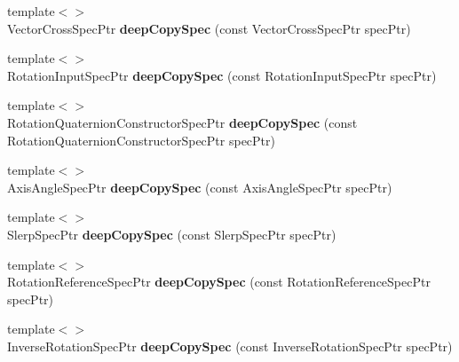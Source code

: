 \begin{DoxyCompactItemize}
\item 
\hypertarget{namespacegiskard__suturo_adc66694859df7fe09089b87107113737}{{\footnotesize template$<$$>$ }\\Vector\-Cross\-Spec\-Ptr {\bfseries deep\-Copy\-Spec} (const Vector\-Cross\-Spec\-Ptr spec\-Ptr)}\label{namespacegiskard__suturo_adc66694859df7fe09089b87107113737}

\item 
\hypertarget{namespacegiskard__suturo_ac5bf0b2ed34f80dd525c84e8700311f6}{{\footnotesize template$<$$>$ }\\Rotation\-Input\-Spec\-Ptr {\bfseries deep\-Copy\-Spec} (const Rotation\-Input\-Spec\-Ptr spec\-Ptr)}\label{namespacegiskard__suturo_ac5bf0b2ed34f80dd525c84e8700311f6}

\item 
\hypertarget{namespacegiskard__suturo_a8c1b9e0b11fcdef9b8a04fccae1e26cf}{{\footnotesize template$<$$>$ }\\Rotation\-Quaternion\-Constructor\-Spec\-Ptr {\bfseries deep\-Copy\-Spec} (const Rotation\-Quaternion\-Constructor\-Spec\-Ptr spec\-Ptr)}\label{namespacegiskard__suturo_a8c1b9e0b11fcdef9b8a04fccae1e26cf}

\item 
\hypertarget{namespacegiskard__suturo_ab0227fb767bd51652c4e56f6b62aa10a}{{\footnotesize template$<$$>$ }\\Axis\-Angle\-Spec\-Ptr {\bfseries deep\-Copy\-Spec} (const Axis\-Angle\-Spec\-Ptr spec\-Ptr)}\label{namespacegiskard__suturo_ab0227fb767bd51652c4e56f6b62aa10a}

\item 
\hypertarget{namespacegiskard__suturo_a4fee01abe55e2b542a2dde62dc441e5f}{{\footnotesize template$<$$>$ }\\Slerp\-Spec\-Ptr {\bfseries deep\-Copy\-Spec} (const Slerp\-Spec\-Ptr spec\-Ptr)}\label{namespacegiskard__suturo_a4fee01abe55e2b542a2dde62dc441e5f}

\item 
\hypertarget{namespacegiskard__suturo_acb41699912961898de229356d035c6cf}{{\footnotesize template$<$$>$ }\\Rotation\-Reference\-Spec\-Ptr {\bfseries deep\-Copy\-Spec} (const Rotation\-Reference\-Spec\-Ptr spec\-Ptr)}\label{namespacegiskard__suturo_acb41699912961898de229356d035c6cf}

\item 
\hypertarget{namespacegiskard__suturo_aefe3f48b30e19eb69adaecb6c4588b00}{{\footnotesize template$<$$>$ }\\Inverse\-Rotation\-Spec\-Ptr {\bfseries deep\-Copy\-Spec} (const Inverse\-Rotation\-Spec\-Ptr spec\-Ptr)}\label{namespacegiskard__suturo_aefe3f48b30e19eb69adaecb6c4588b00}


\end{DoxyCompactItemize}
